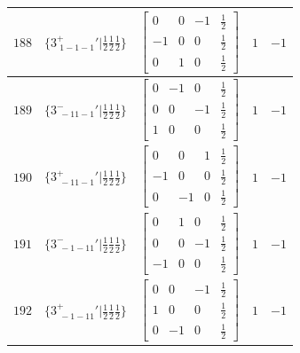 \documentclass[fleqn,8pt]{jsarticle}
\begin{document}
\begin{longtable}{ccccc}
$ 188 $ & $ \{3^{+}_{\,\,1-1-1}{}'|\frac{1}{2} \frac{1}{2} \frac{1}{2}\} $ & $ \begin{bmatrix} 0 & 0 & -1 & \frac{1}{2} \\ -1 & 0 & 0 & \frac{1}{2} \\ 0 & 1 & 0 & \frac{1}{2} \end{bmatrix} $ & $ 1 $ & $ -1 $ \\ \hline
$ 189 $ & $ \{3^{-}_{\,\,-11-1}{}'|\frac{1}{2} \frac{1}{2} \frac{1}{2}\} $ & $ \begin{bmatrix} 0 & -1 & 0 & \frac{1}{2} \\ 0 & 0 & -1 & \frac{1}{2} \\ 1 & 0 & 0 & \frac{1}{2} \end{bmatrix} $ & $ 1 $ & $ -1 $ \\ \hline
$ 190 $ & $ \{3^{+}_{\,\,-11-1}{}'|\frac{1}{2} \frac{1}{2} \frac{1}{2}\} $ & $ \begin{bmatrix} 0 & 0 & 1 & \frac{1}{2} \\ -1 & 0 & 0 & \frac{1}{2} \\ 0 & -1 & 0 & \frac{1}{2} \end{bmatrix} $ & $ 1 $ & $ -1 $ \\ \hline
$ 191 $ & $ \{3^{-}_{\,\,-1-11}{}'|\frac{1}{2} \frac{1}{2} \frac{1}{2}\} $ & $ \begin{bmatrix} 0 & 1 & 0 & \frac{1}{2} \\ 0 & 0 & -1 & \frac{1}{2} \\ -1 & 0 & 0 & \frac{1}{2} \end{bmatrix} $ & $ 1 $ & $ -1 $ \\ \hline
$ 192 $ & $ \{3^{+}_{\,\,-1-11}{}'|\frac{1}{2} \frac{1}{2} \frac{1}{2}\} $ & $ \begin{bmatrix} 0 & 0 & -1 & \frac{1}{2} \\ 1 & 0 & 0 & \frac{1}{2} \\ 0 & -1 & 0 & \frac{1}{2} \end{bmatrix} $ & $ 1 $ & $ -1 $ \\
\end{longtable}
\end{document}
